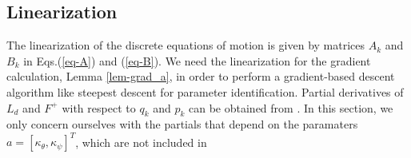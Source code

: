 \documentclass[letterpaper, 10pt, conference]{ieeeconf}
\begin{document}
\subsection{Linearization}
The linearization of the discrete equations of motion is given by matrices $A_k$ and $B_k$ in Eqs.(\ref{eq-A}) and (\ref{eq-B}).  We need the linearization for the gradient calculation, Lemma \ref{lem-grad_a}, in order to perform a gradient-based descent algorithm like steepest descent for parameter identification.  Partial derivatives of $L_d$ and $F^+$ with respect to $q_k$ and $p_k$ can be obtained from \cite{johnson_murphey_linearization}.  In this section, we only concern ourselves with the partials that depend on the paramaters $a = [\kappa_\theta,\kappa_\psi]^T$, which are not included in \cite{johnson_murphey_linearization}
\end{document}
